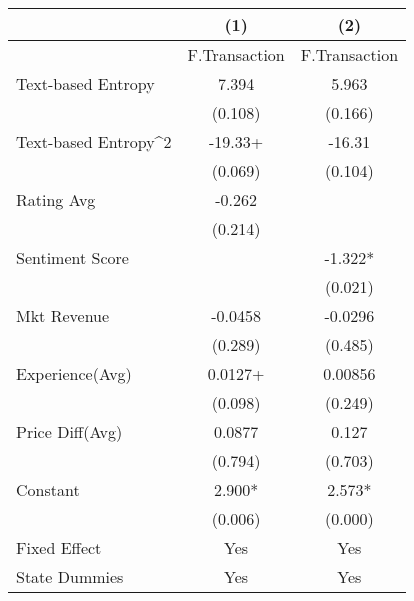 \begin{table}[]
\centering
\begin{tabular}{@{}lcc@{}}
\toprule
                                      & (1)                 & (2)           \\ \midrule
                                      & F.Transaction       & F.Transaction \\
Text-based Entropy                    & 7.394               & 5.963         \\
                                      & (0.108)             & (0.166)       \\
Text-based Entropy\textasciicircum{}2 & -19.33+             & -16.31        \\
                                      & (0.069)             & (0.104)       \\
Rating Avg                            & -0.262              &               \\
                                      & (0.214)             &               \\
Sentiment Score                       &                     & -1.322*       \\
                                      &                     & (0.021)       \\
Mkt Revenue                           & -0.0458             & -0.0296       \\
                                      & (0.289)             & (0.485)       \\
Experience(Avg)                       & 0.0127+             & 0.00856       \\
                                      & (0.098)             & (0.249)       \\
Price Diff(Avg)                       & 0.0877              & 0.127         \\
                                      & (0.794)             & (0.703)       \\
Constant                              & 2.900*              & 2.573*        \\
                                      & (0.006)             & (0.000)       \\
Fixed Effect                          & Yes                 & Yes           \\
State Dummies                         & Yes                 & Yes           \\

\end{tabular}
\end{table}
